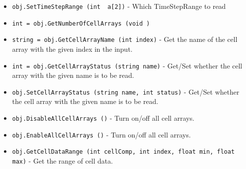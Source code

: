 \begin{itemize}
\item  \verb|obj.SetTimeStepRange (int  a[2])| -  Which TimeStepRange to read

\item  \verb|int = obj.GetNumberOfCellArrays (void )|

\item  \verb|string = obj.GetCellArrayName (int index)| -  Get the name of the  cell array with the given index in
 the input.

\item  \verb|int = obj.GetCellArrayStatus (string name)| -  Get/Set whether the cell array with the given name is to
 be read.

\item  \verb|obj.SetCellArrayStatus (string name, int status)| -  Get/Set whether the cell array with the given name is to
 be read.

\item  \verb|obj.DisableAllCellArrays ()| -  Turn on/off all cell arrays.

\item  \verb|obj.EnableAllCellArrays ()| -  Turn on/off all cell arrays.

\item  \verb|obj.GetCellDataRange (int cellComp, int index, float min, float max)| -  Get the range of cell data.

\end{itemize}
